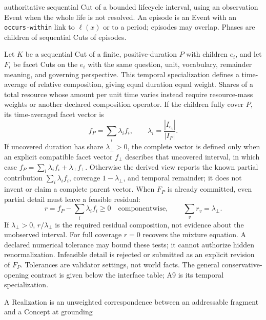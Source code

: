 \documentclass[11pt,a4paper]{article}
\newcommand{\lc}{\ell}
\begin{document}
\begin{description}
    authoritative sequential Cut of a bounded lifecycle interval, using an
    observation Event when the whole life is not resolved. An episode is
    an Event with an \texttt{occurs-within} link to $\lc(x)$ or to a period;
    episodes may overlap. Phases are children of sequential Cuts of episodes.
  \item[A9 Profile---Mixture law.] Let $K$ be a sequential Cut of a finite,
    positive-duration $P$ with children
    $e_i$, and let $F_i$ be facet Cuts on the $e_i$ with the same question,
    unit, vocabulary, remainder meaning, and governing perspective.
    This temporal specialization defines a time-average of relative composition,
    giving equal duration equal weight. Shares of a total resource whose amount
    per unit time varies instead require resource-mass weights or another
    declared composition operator. If the children fully cover $P$, its
    time-averaged facet vector is
    \begin{equation}
      f_P=\sum_i \lambda_i f_i,\qquad
      \lambda_i=\frac{|I_{e_i}|}{|I_P|}.
    \end{equation}
    If uncovered duration has share $\lambda_\bot>0$, the complete vector is
    defined only when an explicit compatible facet vector $f_\bot$ describes
    that uncovered interval, in which case
    $f_P=\sum_i\lambda_i f_i+\lambda_\bot f_\bot$. Otherwise the derived view
    reports the known partial contribution $\sum_i\lambda_i f_i$, coverage
    $1-\lambda_\bot$, and temporal remainder; it does not invent or claim a
    complete parent vector.
    When $F_P$ is already committed, even partial detail must leave a feasible
    residual:
    \begin{equation}
      r=f_P-\sum_i\lambda_i f_i\ge 0\quad\text{componentwise},\qquad
      \sum_v r_v=\lambda_\bot.
    \end{equation}
    If $\lambda_\bot>0$, $r/\lambda_\bot$ is the required residual
    composition, not evidence about the unobserved interval. For full
    coverage $r=0$ recovers the mixture equation. A declared numerical
    tolerance may bound these tests; it cannot authorize hidden
    renormalization. Infeasible detail is rejected or submitted as an
    explicit revision of $F_P$. Tolerances are validator settings, not world
    facts. The general conservative-opening contract is given below the
    interface table; A9 is its temporal specialization.
  \item[A10 Core---Realization.] A Realization is an unweighted
    correspondence between an addressable fragment and a Concept at grounding

\end{description}
\end{document}
